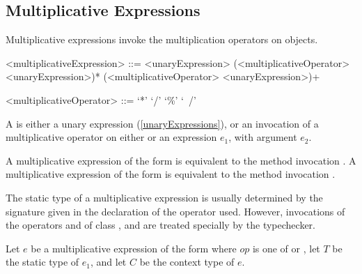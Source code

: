 \documentclass[makeidx]{article}
\begin{document}
\subsection{Multiplicative Expressions}

\LMHash{}%
Multiplicative expressions invoke the multiplication operators on objects.

\begin{grammar}
<multiplicativeExpression> ::= \gnewline{}
  <unaryExpression> (<multiplicativeOperator> <unaryExpression>)*
  \alt \SUPER{} (<multiplicativeOperator> <unaryExpression>)+

<multiplicativeOperator> ::= `*'
  \alt `/'
  \alt `\%'
  \alt `~/'
\end{grammar}

\LMHash{}%
A  is either a unary expression
(\ref{unaryExpressions}),
or an invocation of a multiplicative operator
on either \SUPER{} or an expression $e_1$,
with argument $e_2$.

\LMHash{}%
A multiplicative expression of the form 
is equivalent to the method invocation .
A multiplicative expression of the form 
is equivalent to the method invocation .

\LMHash{}%
The static type of a multiplicative expression is usually determined
by the signature given in the declaration of the operator used.
However, invocations of the operators \code{*} and \code{\%} of
class ,  and 
are treated specially by the typechecker.

\LMHash{}%
Let $e$ be a multiplicative expression of the form 
where $op$ is one of \code{*} or \code{\%},
let $T$ be the static type of $e_1$,
and let $C$ be the context type of $e$.
\end{document}
